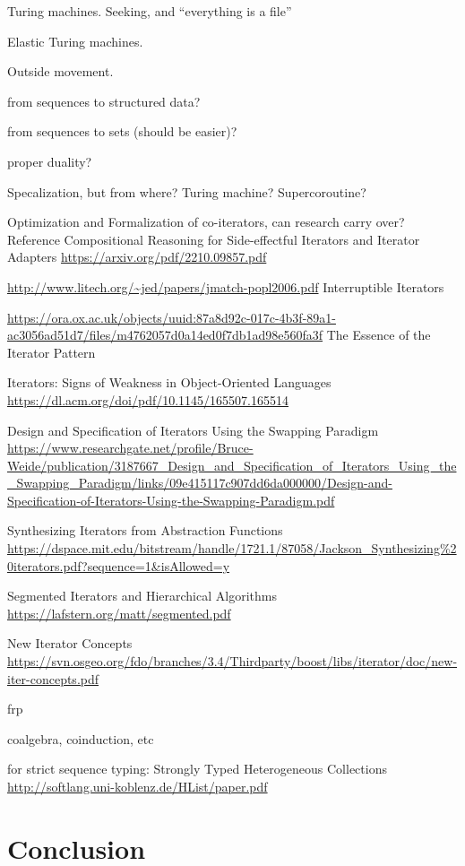 \documentclass[sigplan,screen,10pt,anonymous,review]{acmart}
\begin{document}
Turing machines.
Seeking, and ``everything is a file''

Elastic Turing machines.

Outside movement.

from sequences to structured data?

from sequences to sets (should be easier)?

proper duality?

Specalization, but from where? Turing machine? Supercoroutine?

Optimization and Formalization of co-iterators, can research carry over? Reference Compositional Reasoning for Side-effectful
Iterators and Iterator Adapters \url{https://arxiv.org/pdf/2210.09857.pdf}

\url{http://www.litech.org/~jed/papers/jmatch-popl2006.pdf} Interruptible Iterators

\url{https://ora.ox.ac.uk/objects/uuid:87a8d92c-017c-4b3f-89a1-ac3056ad51d7/files/m4762057d0a14ed0f7db1ad98e560fa3f} The Essence of the Iterator Pattern

Iterators: Signs of Weakness in Object-Oriented Languages \url{https://dl.acm.org/doi/pdf/10.1145/165507.165514}

Design and Specification of Iterators Using the Swapping Paradigm \url{https://www.researchgate.net/profile/Bruce-Weide/publication/3187667_Design_and_Specification_of_Iterators_Using_the_Swapping_Paradigm/links/09e415117c907dd6da000000/Design-and-Specification-of-Iterators-Using-the-Swapping-Paradigm.pdf}

Synthesizing Iterators from Abstraction Functions \url{https://dspace.mit.edu/bitstream/handle/1721.1/87058/Jackson_Synthesizing%20iterators.pdf?sequence=1&isAllowed=y}

Segmented Iterators and Hierarchical Algorithms \url{https://lafstern.org/matt/segmented.pdf}

New Iterator Concepts \url{https://svn.osgeo.org/fdo/branches/3.4/Thirdparty/boost/libs/iterator/doc/new-iter-concepts.pdf}

frp

coalgebra, coinduction, etc


for strict sequence typing: Strongly Typed Heterogeneous Collections \url{http://softlang.uni-koblenz.de/HList/paper.pdf}

\section{Conclusion}\label{conclusion}
\end{document}
